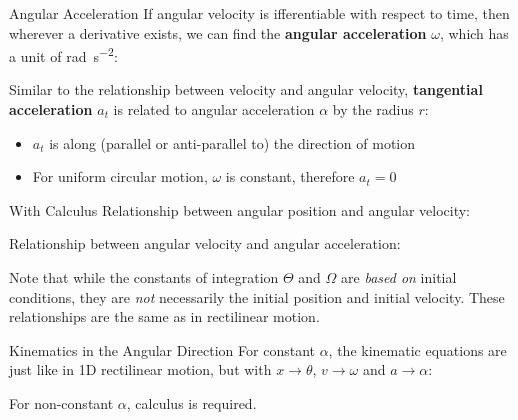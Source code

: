 \documentclass[12pt,compress,aspectratio=169]{beamer}
\begin{document}
\begin{frame}{Angular Acceleration}
  If angular velocity is ifferentiable with respect to time, then wherever a
  derivative exists, we can find the \textbf{angular acceleration} $\omega$,
  which has a unit of \si{\radian\per\second\squared}:


  Similar to the relationship between velocity and angular velocity,
  \textbf{tangential acceleration} $a_t$ is related to angular acceleration
  $\alpha$ by the radius $r$:
    

  \begin{itemize}
  \item $a_t$ is along (parallel or anti-parallel to) the direction of motion
  \item For uniform circular motion, $\omega$ is constant, therefore $a_t=0$
  \end{itemize}
\end{frame}



\begin{frame}{With Calculus}
  Relationship between angular position and angular velocity:


  Relationship between angular velocity and angular acceleration:


  Note that while the constants of integration $\Theta$ and $\Omega$ are
  \emph{based on} initial conditions, they are \emph{not} necessarily the
  initial position and initial velocity. These relationships are the same as
  in rectilinear motion.
\end{frame}




\begin{frame}{Kinematics in the Angular Direction}
  For constant $\alpha$, the kinematic equations are just like in 1D rectilinear
  motion, but with $x\to\theta$, $v\to\omega$ and $a\to\alpha$:

  \vspace{-.3in}{\large
    \begin{align*}
      \theta &=\theta_0 + \omega_0 t + \frac12\alpha t^2\\
      \omega &=\omega_0+ \alpha t\\
      \omega^2& = \omega_0^2+ 2\alpha(\theta-\theta_0)
    \end{align*}
  }
  
  For non-constant $\alpha$, calculus is required.
\end{frame}
\end{document}
